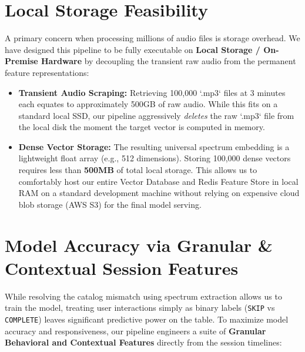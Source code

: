 \documentclass[12pt, letterpaper]{article}
\begin{document}
\section{Local Storage Feasibility}
A primary concern when processing millions of audio files is storage overhead. We have designed this pipeline to be fully executable on \textbf{Local Storage / On-Premise Hardware} by decoupling the transient raw audio from the permanent feature representations:
\begin{itemize}
    \item \textbf{Transient Audio Scraping:} Retrieving 100,000 `.mp3` files at 3 minutes each equates to approximately 500GB of raw audio. While this fits on a standard local SSD, our pipeline aggressively \textit{deletes} the raw `.mp3` file from the local disk the moment the target vector is computed in memory.
    \item \textbf{Dense Vector Storage:} The resulting universal spectrum embedding is a lightweight float array (e.g., 512 dimensions). Storing 100,000 dense vectors requires less than \textbf{500MB} of total local storage. This allows us to comfortably host our entire Vector Database and Redis Feature Store in local RAM on a standard development machine without relying on expensive cloud blob storage (AWS S3) for the final model serving.
\end{itemize}

\section{Model Accuracy via Granular \& Contextual Session Features}
While resolving the catalog mismatch using spectrum extraction allows us to train the model, treating user interactions simply as binary labels (\texttt{SKIP} vs \texttt{COMPLETE}) leaves significant predictive power on the table. To maximize model accuracy and responsiveness, our pipeline engineers a suite of \textbf{Granular Behavioral and Contextual Features} directly from the session timelines:
\end{document}
